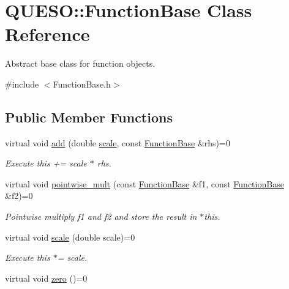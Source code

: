 \hypertarget{class_q_u_e_s_o_1_1_function_base}{\section{Q\-U\-E\-S\-O\-:\-:Function\-Base Class Reference}
\label{class_q_u_e_s_o_1_1_function_base}
}


Abstract base class for function objects.  




{\ttfamily \#include $<$Function\-Base.\-h$>$}

\subsection*{Public Member Functions}
\begin{DoxyCompactItemize}
\item 
virtual void \hyperlink{class_q_u_e_s_o_1_1_function_base_a0a6135d94fa022bd3775d712fc23e32b}{add} (double \hyperlink{class_q_u_e_s_o_1_1_function_base_a542ed1bd28072fd53fcd7a49d8f2f77b}{scale}, const \hyperlink{class_q_u_e_s_o_1_1_function_base}{Function\-Base} \&rhs)=0
\begin{DoxyCompactList}\small\item\em Execute {\ttfamily this} += {\ttfamily scale} $\ast$ {\ttfamily rhs}. \end{DoxyCompactList}\item 
virtual void \hyperlink{class_q_u_e_s_o_1_1_function_base_af3ccfeaae0a8e918d9ce422b9c18c7ca}{pointwise\-\_\-mult} (const \hyperlink{class_q_u_e_s_o_1_1_function_base}{Function\-Base} \&f1, const \hyperlink{class_q_u_e_s_o_1_1_function_base}{Function\-Base} \&f2)=0
\begin{DoxyCompactList}\small\item\em Pointwise multiply {\ttfamily f1} and {\ttfamily f2} and store the result in {\ttfamily $\ast$this}. \end{DoxyCompactList}\item 
virtual void \hyperlink{class_q_u_e_s_o_1_1_function_base_a542ed1bd28072fd53fcd7a49d8f2f77b}{scale} (double scale)=0
\begin{DoxyCompactList}\small\item\em Execute {\ttfamily this} $\ast$= {\ttfamily scale}. \end{DoxyCompactList}\item 
virtual void \hyperlink{class_q_u_e_s_o_1_1_function_base_a9b07ff14bb5e2511afb555dcbcbfe83b}{zero} ()=0

\end{DoxyCompactItemize}
